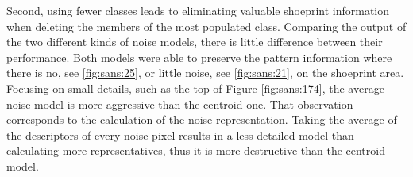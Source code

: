 \documentclass[draft,final]{vutinfth} %
\begin{document}
Second, using fewer classes leads to eliminating valuable shoeprint information when deleting the members of the most populated class.
Comparing the output of the two different kinds of noise models, there is little difference between their performance.
Both models were able to preserve the pattern information where there is no, see  \ref{fig:sans:25}, or little noise, see  \ref{fig:sans:21}, on the shoeprint area.
Focusing on small details, such as the top of Figure \ref{fig:sans:174}, the average noise model is more aggressive than the centroid one.
That observation corresponds to the calculation of the noise representation.
Taking the average of the descriptors of every noise pixel results in a less detailed model than calculating more representatives, thus it is more destructive than the centroid model.


\end{document}
